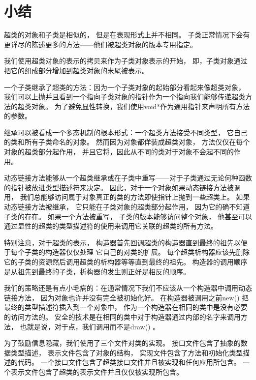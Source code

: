 \section{小结}
超类的对象和子类是相似的，
但是在表现形式上并不相同。
子类正常情况下会有更详尽的陈述更多的方法——他们被超类对象的版本专用指定。

我们使用超类对象的表示的拷贝来作为子类对象表示的开始，
即，子类对象通过把它的组成部分增加到超类对象的末尾被表示。

一个子类继承了超类的方法：因为一个子类对象的起始部分看起来像超类对象，
我们可以上抛并且看到一个指向子类对象的指针作为一个指向我们能够传递超类方法的超类对象。
为了避免显性转换，我们使用void*作为通用指针来声明所有方法的参数。

继承可以被看成一个多态机制的根本形式：一个超类方法接受不同类型，
它自己的类和所有子类命名的对象。
然而因为对象都佯装成超类对象，
方法仅仅在每个对象的超类部分起作用，
并且它将，因此从不同的类对于对象不会起不同的作用。

动态链接方法能够从一个超类继承或在子类中重写——对于子类通过无论何种函数
的指针被放进类型描述符来决定。
因此，对于一个对象如果动态链接方法被调用，
我们总能够访问属于对象真正的类的方法即使指针上抛到一些超类上。
如果动态链接方法被继承，
它只能在子类对象的超类部分起作用，
因为它的确不知道子类的存在。
如果一个方法被重写，
子类的版本能够访问整个对象，
他甚至可以通过显性的超类的类型描述符的使用来调用它关联的超类的所有方法。

特别注意，对于超类的表示，
构造器首先回调超类的构造器直到最终的祖先以便于每个子类的构造器仅仅处理
它自己的对类的扩展。
每个超类析构器应该先删除它的子类的资源然后调用超类的析构器等等直到最终的祖先。
构造器的调用顺序是从祖先到最终的子类，析构器的发生则正好是相反的顺序。

我们的策略还是有点小毛病的：在通常情况下我们不应该从一个构造器中调用动态链接方法，
因为对象也许并没有完全被初始化好。
在构造器被调用之前new() 把最终的类型描述符插入到一个对象中，
作为一个构造器在相同的类中是没有必要的访问方法的。
安全的技术是在相同的类中对于构造器通过内部的名字来调用方法，
也就是说，对于点，我们调用而不是draw() 。

为了鼓励信息隐藏，我们使用了三个文件对类的实现。
接口文件包含了抽象的数据类型描述，
表示文件包含了对象的结构，
实现文件包含了方法和初始化类型描述的代码。
一个接口文件包含了超类接口文件并且被实现和任何应用所包含。
一个表示文件包含了超类的表示文件并且仅仅被实现所包含。

